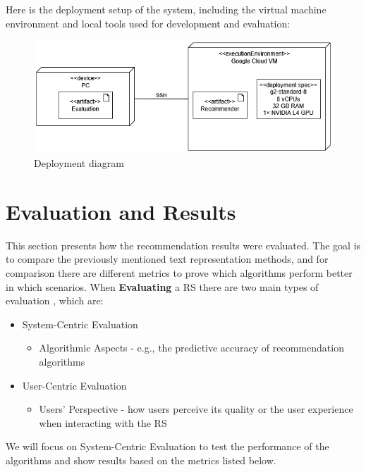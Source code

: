 \documentclass[\myFontSize,a4paper,oneside,hidelinks]{article}
\begin{document}
Here is the deployment setup of the system, including the virtual machine environment and local tools used for development and evaluation:
\begin{figure}[H]
    \centering
    \includegraphics[width=1\textwidth]{img/deployment.png}
    \caption{Deployment diagram}
    \label{fig:deployment_diagram}
\end{figure}


%
%

\clearpage
\section{Evaluation and Results}
This section presents how the recommendation results were evaluated. The goal is to compare the previously mentioned text representation methods, and for comparison there are different metrics to prove which algorithms perform better in which scenarios. When \textbf{Evaluating} a RS there are two main types of evaluation \cite{Zangerle2023}, which are:
\begin{itemize}
\item System-Centric Evaluation
	\begin{itemize}
	\item Algorithmic Aspects - e.g., the predictive accuracy of recommendation algorithms
	\end{itemize}

\item User-Centric Evaluation
	\begin{itemize}
	\item Users' Perspective - how users perceive its quality or the user experience when interacting with the RS
	\end{itemize}
\end{itemize}
%
%
We will focus on System-Centric Evaluation to test the performance of the algorithms and show results based on the metrics listed below.
%
%
\end{document}
